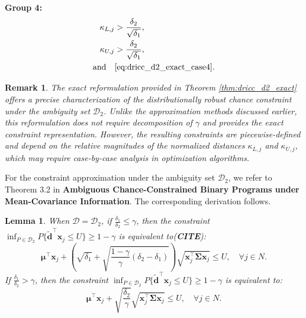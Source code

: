 \documentclass[preprint,12pt,authoryear]{elsarticle}
\newtheorem{lemma}{Lemma}
\newtheorem{remark}{Remark}
\begin{document}
\textbf{Group 4:}
\begin{align}
\kappa_{L,j} &> \frac{\delta_2}{\sqrt{\delta_1}}, \label{eq:group4_range1} \\
\kappa_{U,j} &> \frac{\delta_2}{\sqrt{\delta_1}}, \label{eq:group4_range2} \\
\text{and} \quad &\eqref{eq:dricc_d2_exact_case4}.
\end{align}



\begin{remark}
The exact reformulation provided in Theorem \ref{thm:dricc_d2_exact} offers a precise characterization of the distributionally robust chance constraint under the ambiguity set $\mathcal{D}_2$. Unlike the approximation methods discussed earlier, this reformulation does not require decomposition of $\gamma$ and provides the exact constraint representation. However, the resulting constraints are piecewise-defined and depend on the relative magnitudes of the normalized distances $\kappa_{L,j}$ and $\kappa_{U,j}$, which may require case-by-case analysis in optimization algorithms.
\end{remark}

For the constraint approximation under the ambiguity set $\mathcal{D}_2$, we refer to Theorem 3.2 in \textbf{Ambiguous Chance-Constrained Binary Programs under Mean-Covariance Information}. The corresponding derivation follows.

\begin{lemma}\label{lem:dricc_d2}
When $\mathcal{D} = \mathcal{D}_2$, if $\frac{\delta_1}{\delta_2} \leqslant \gamma$, then the constraint $\inf_{P \in \mathcal{D}_2} P \{\widetilde{\mathbf{d}}^\top \mathbf{x}_j \leqslant U\} \geqslant 1 - \gamma$ is equivalent to(\textbf{CITE}):
\begin{equation}
\boldsymbol{\mu}^\top \mathbf{x}_j + \left(\sqrt{\delta_1} + \sqrt{\frac{1 - \gamma}{\gamma} (\delta_2 - \delta_1)}\right) \sqrt{\mathbf{x}_j^\top \boldsymbol{\Sigma} \mathbf{x}_j} \leqslant U, \quad \forall j \in N. \label{eq:dricc_d2_reform1}
\end{equation}
If $\frac{\delta_1}{\delta_2} > \gamma$, then the constraint $\inf_{P \in \mathcal{D}_2} P \{\widetilde{\mathbf{d}}^\top \mathbf{x}_j \leqslant U\} \geqslant 1 - \gamma$ is equivalent to:
\begin{equation}
\boldsymbol{\mu}^\top \mathbf{x}_j + \sqrt{\frac{\delta_2}{\gamma}} \sqrt{\mathbf{x}_j^\top \boldsymbol{\Sigma} \mathbf{x}_j} \leqslant U, \quad \forall j \in N. \label{eq:dricc_d2_reform2}
\end{equation}
\end{lemma}
\end{document}
